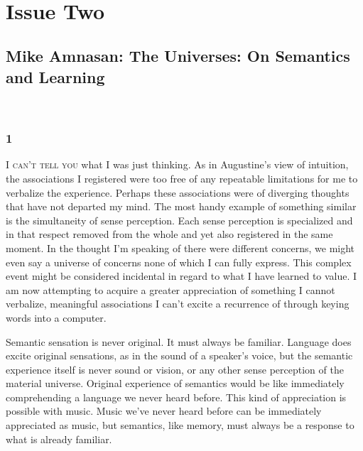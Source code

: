 \documentclass[
]{memoir}
\begin{document}
~

\part*{Issue Two}

\hypertarget{mike-amnasan-the-universes-on-semantics-and-learning}{%
\chapter{Mike Amnasan: The Universes: On Semantics and
Learning}\label{mike-amnasan-the-universes-on-semantics-and-learning}}

~

\hypertarget{section-14}{%
\section*{1}\label{section-14}}

\lettrine[lines=3, findent=0em, nindent=0.1em, lhang=0]{I}{ can’t tell you}
what I was just thinking. As in Augustine's view of intuition, the
associations I registered were too free of any repeatable limitations
for me to verbalize the experience. Perhaps these associations were of
diverging thoughts that have not departed my mind. The most handy
example of something similar is the simultaneity of sense perception.
Each sense perception is specialized and in that respect removed from
the whole and yet also registered in the same moment. In the thought I'm
speaking of there were different concerns, we might even say a universe
of concerns none of which I can fully express. This complex event might
be considered incidental in regard to what I have learned to value. I am
now attempting to acquire a greater appreciation of something I cannot
verbalize, meaningful associations I can't excite a recurrence of
through keying words into a computer.

Semantic sensation is never original. It must always be familiar.
Language does excite original sensations, as in the sound of a speaker's
voice, but the semantic experience itself is never sound or vision, or
any other sense perception of the material universe. Original experience
of semantics would be like immediately comprehending a language we never
heard before. This kind of appreciation is possible with music. Music
we've never heard before can be immediately appreciated as music, but
semantics, like memory, must always be a response to what is already
familiar.
\end{document}

